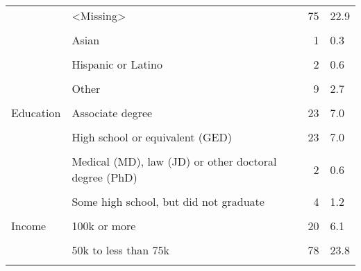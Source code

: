 \documentclass[border=1mm]{standalone}
\begin{document}
\begin{table}[!h]
\begin{tabular}[t]{lllrl}
 & <Missing> &  & 75 & \vphantom{2} 22.9\\
\addlinespace
\cellcolor{gray!10}{Race} & \cellcolor{gray!10}{White} & \cellcolor{gray!10}{} & \cellcolor{gray!10}{180} & \cellcolor{gray!10}{54.9}\\
 & Asian &  & 1 & 0.3\\
\cellcolor{gray!10}{} & \cellcolor{gray!10}{Black or African American} & \cellcolor{gray!10}{} & \cellcolor{gray!10}{48} & \cellcolor{gray!10}{14.6}\\
 & Hispanic or Latino &  & 2 & 0.6\\
\cellcolor{gray!10}{} & \cellcolor{gray!10}{Native Hawaiian or Pacific Islander} & \cellcolor{gray!10}{} & \cellcolor{gray!10}{10} & \cellcolor{gray!10}{3.0}\\
\addlinespace
 & Other &  & 9 & 2.7\\
\cellcolor{gray!10}{} & \cellcolor{gray!10}{<Missing>} & \cellcolor{gray!10}{} & \cellcolor{gray!10}{78} & \cellcolor{gray!10}{23.8}\\
Education & Associate degree &  & 23 & 7.0\\
\cellcolor{gray!10}{} & \cellcolor{gray!10}{Bachelor's degree (BA/BS)} & \cellcolor{gray!10}{} & \cellcolor{gray!10}{122} & \cellcolor{gray!10}{37.2}\\
 & High school or equivalent (GED) &  & 23 & 7.0\\
\addlinespace
\cellcolor{gray!10}{} & \cellcolor{gray!10}{Master's degree (MA/MS/MBA)} & \cellcolor{gray!10}{} & \cellcolor{gray!10}{54} & \cellcolor{gray!10}{16.5}\\
 & Medical (MD), law (JD) or other doctoral degree (PhD) &  & 2 & 0.6\\
\cellcolor{gray!10}{} & \cellcolor{gray!10}{Some college, but did not complete a degree} & \cellcolor{gray!10}{} & \cellcolor{gray!10}{25} & \cellcolor{gray!10}{7.6}\\
 & Some high school, but did not graduate &  & 4 & 1.2\\
\cellcolor{gray!10}{} & \cellcolor{gray!10}{<Missing>} & \cellcolor{gray!10}{} & \cellcolor{gray!10}{75} & \cellcolor{gray!10}{\vphantom{1} 22.9}\\
\addlinespace
Income & 100k or more &  & 20 & 6.1\\
\cellcolor{gray!10}{} & \cellcolor{gray!10}{25k to less than 50k} & \cellcolor{gray!10}{} & \cellcolor{gray!10}{75} & \cellcolor{gray!10}{22.9}\\
 & 50k to less than 75k &  & 78 & 23.8\\
\cellcolor{gray!10}{} & \cellcolor{gray!10}{75k to less than 100k} & \cellcolor{gray!10}{} & \cellcolor{gray!10}{49} & \cellcolor{gray!10}{14.9}\\

\end{tabular}
\end{table}
\end{document}
